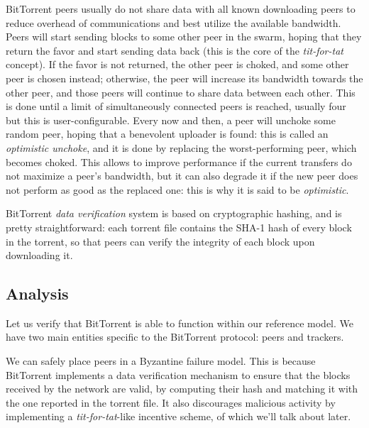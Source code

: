 \documentclass[mscthesis]{usiinfthesis}
\begin{document}
BitTorrent peers usually do not share data with all known downloading peers to reduce overhead of communications and best utilize the available bandwidth. Peers will start sending blocks to some other peer in the swarm, hoping that they return the favor and start sending data back (this is the core of the \textit{tit-for-tat} concept). If the favor is not returned, the other peer is choked, and some other peer is chosen instead; otherwise, the peer will increase its bandwidth towards the other peer, and those peers will continue to share data between each other. This is done until a limit of simultaneously connected peers is reached, usually four but this is user-configurable. Every now and then, a peer will unchoke some random peer, hoping that a benevolent uploader is found: this is called an \textit{optimistic unchoke}, and it is done by replacing the worst-performing peer, which becomes choked. This allows to improve performance if the current transfers do not maximize a peer's bandwidth, but it can also degrade it if the new peer does not perform as good as the replaced one: this is why it is said to be \textit{optimistic}.

BitTorrent \emph{data verification} system is based on cryptographic hashing, and is pretty straightforward: each torrent file contains the SHA-1 hash of every block in the torrent, so that peers can verify the integrity of each block upon downloading it.

\subsection{Analysis}\label{sec:btanalysis}
Let us verify that BitTorrent is able to function within our reference model. We have two main entities specific to the BitTorrent protocol: peers and trackers. 

We can safely place peers in a Byzantine failure model. This is because BitTorrent implements a data verification mechanism to ensure that the blocks received by the network are valid, by computing their hash and matching it with the one reported in the torrent file. It also discourages malicious activity by implementing a \textit{tit-for-tat}-like incentive scheme, of which we'll talk about later.
\end{document}
